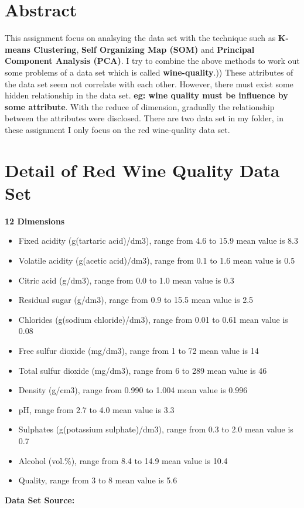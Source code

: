 \documentclass[titlepage,a4paper,12pt,thmsb]{report}
\begin{document}
\chapter*{Abstract}
This assignment focus on analsying the data set with the technique such as {\bf K-means Clustering}, {\bf Self Organizing Map (SOM)} and {\bf Principal Component Analysis (PCA)}. I try to combine the above methods to work out some problems of a data set which is called {\bf wine-quality}.))
These attributes of the data set seem not correlate with each other. However, there must exist some hidden relationship in the data set. {\bf eg: wine quality must be influence by some attribute}. With the reduce of dimension, gradually the relationship between the attributes were disclosed.  There are two data set in my folder, in these assignment I only focus on the red wine-quality data set.


\chapter*{Detail of Red Wine Quality Data Set}
{\large \bf {12 Dimensions}}
\begin{itemize}
\item{Fixed acidity (g(tartaric acid)/dm3), range from 4.6 to 15.9 mean value is	8.3}
\item{Volatile acidity (g(acetic acid)/dm3),  range from	0.1 to 1.6 mean value is 0.5}
\item{Citric acid (g/dm3), range from 0.0 to 1.0 mean value is 0.3}
\item{Residual sugar (g/dm3), range from 0.9	to 15.5 mean value is 2.5  }
\item{Chlorides (g(sodium chloride)/dm3), range from 0.01 to 0.61 mean value is 0.08}
\item{Free sulfur dioxide (mg/dm3), range from 1 to 72 mean value is 14}
\item{Total sulfur dioxide (mg/dm3), range from 6 to 289 mean value is 46 }
\item{Density (g/cm3), range from 0.990 to 1.004 mean value is 0.996}
\item{pH, range from 2.7 to 4.0 mean value is 3.3 }
\item{Sulphates (g(potassium sulphate)/dm3), range from 0.3 to 2.0 mean value is 0.7 }
\item{Alcohol (vol.\%), range from 8.4 to 14.9 mean value is 10.4 }
\item{Quality, range from 3 to 8 mean value is 5.6}

\end{itemize}
{\large \bf {Data Set Source:}}
\newline{}
{ }
\newline{}
\vspace{0.5cm}
\end{document}
